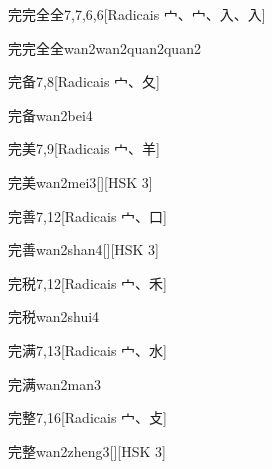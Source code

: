 \begin{entry}{完完全全}{7,7,6,6}[Radicais ⼧、⼧、⼊、⼊]
  \begin{phonetics}{完完全全}{wan2wan2quan2quan2}
  \end{phonetics}
\end{entry}

\begin{entry}{完备}{7,8}[Radicais ⼧、⼡]
  \begin{phonetics}{完备}{wan2bei4}
  \end{phonetics}
\end{entry}

\begin{entry}{完美}{7,9}[Radicais ⼧、⽺]
  \begin{phonetics}{完美}{wan2mei3}[][HSK 3]
  \end{phonetics}
\end{entry}

\begin{entry}{完善}{7,12}[Radicais ⼧、⼝]
  \begin{phonetics}{完善}{wan2shan4}[][HSK 3]
  \end{phonetics}
\end{entry}

\begin{entry}{完税}{7,12}[Radicais ⼧、⽲]
  \begin{phonetics}{完税}{wan2shui4}
  \end{phonetics}
\end{entry}

\begin{entry}{完满}{7,13}[Radicais ⼧、⽔]
  \begin{phonetics}{完满}{wan2man3}
  \end{phonetics}
\end{entry}

\begin{entry}{完整}{7,16}[Radicais ⼧、⽁]
  \begin{phonetics}{完整}{wan2zheng3}[][HSK 3]
  \end{phonetics}
\end{entry}

